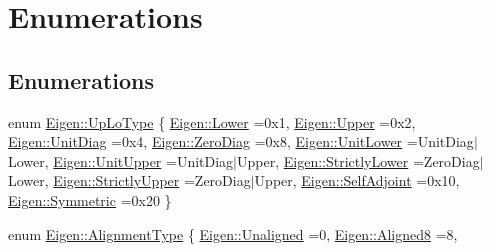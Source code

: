 \hypertarget{group__enums}{}\section{Enumerations}
\label{group__enums}
\subsection*{Enumerations}
\begin{DoxyCompactItemize}
\item 
enum \mbox{\hyperlink{group__enums_ga39e3366ff5554d731e7dc8bb642f83cd}{Eigen\+::\+Up\+Lo\+Type}} \{ \newline
\mbox{\hyperlink{group__enums_gga39e3366ff5554d731e7dc8bb642f83cdaf581029282d421eee5aae14238c6f749}{Eigen\+::\+Lower}} =0x1, 
\mbox{\hyperlink{group__enums_gga39e3366ff5554d731e7dc8bb642f83cdafca2ccebb604f171656deb53e8c083c1}{Eigen\+::\+Upper}} =0x2, 
\mbox{\hyperlink{group__enums_gga39e3366ff5554d731e7dc8bb642f83cda2ef430bff6cc12c2d1e0ef01b95f7ff3}{Eigen\+::\+Unit\+Diag}} =0x4, 
\mbox{\hyperlink{group__enums_gga39e3366ff5554d731e7dc8bb642f83cdac4dc554a61510151ddd5bafaf6040223}{Eigen\+::\+Zero\+Diag}} =0x8, 
\newline
\mbox{\hyperlink{group__enums_gga39e3366ff5554d731e7dc8bb642f83cda8f40b928c10a71ba03e5f75ad2a72fda}{Eigen\+::\+Unit\+Lower}} =Unit\+Diag$\vert$\+Lower, 
\mbox{\hyperlink{group__enums_gga39e3366ff5554d731e7dc8bb642f83cdadd28224d7ea92689930be73c1b50b0ad}{Eigen\+::\+Unit\+Upper}} =Unit\+Diag$\vert$\+Upper, 
\mbox{\hyperlink{group__enums_gga39e3366ff5554d731e7dc8bb642f83cda2424988b6fca98be70b595632753ba81}{Eigen\+::\+Strictly\+Lower}} =Zero\+Diag$\vert$\+Lower, 
\mbox{\hyperlink{group__enums_gga39e3366ff5554d731e7dc8bb642f83cda7b37877e0b9b0df28c9c2b669a633265}{Eigen\+::\+Strictly\+Upper}} =Zero\+Diag$\vert$\+Upper, 
\newline
\mbox{\hyperlink{group__enums_gga39e3366ff5554d731e7dc8bb642f83cdacf9ccb2016f8b9c0f3268f05a1e75821}{Eigen\+::\+Self\+Adjoint}} =0x10, 
\mbox{\hyperlink{group__enums_gga39e3366ff5554d731e7dc8bb642f83cdad5381b2d1c8973a08303c94e7da02333}{Eigen\+::\+Symmetric}} =0x20
 \}
\item 
enum \mbox{\hyperlink{group__enums_ga45fe06e29902b7a2773de05ba27b47a1}{Eigen\+::\+Alignment\+Type}} \{ \newline
\mbox{\hyperlink{group__enums_gga45fe06e29902b7a2773de05ba27b47a1a4e19dd09d5ff42295ba1d72d12a46686}{Eigen\+::\+Unaligned}} =0, 
\mbox{\hyperlink{group__enums_gga45fe06e29902b7a2773de05ba27b47a1a9d99d7a9ff1da5c949bec22733bfba14}{Eigen\+::\+Aligned8}} =8, 

\end{DoxyCompactItemize}
